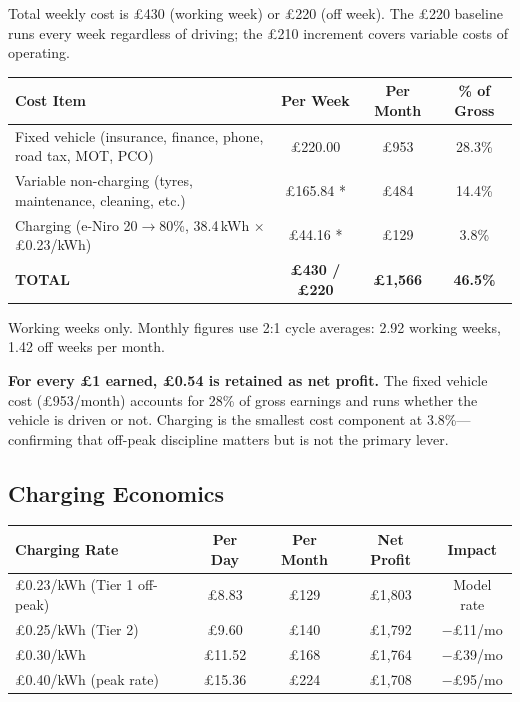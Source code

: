 \documentclass[a4paper,11pt]{article}
\begin{document}
Total weekly cost is \pounds430 (working week) or \pounds220 (off week). The \pounds220 baseline runs every week regardless of driving; the \pounds210 increment covers variable costs of operating.

\begin{tabularx}{\textwidth}{X C C C}
\toprule
\textbf{Cost Item} & \textbf{Per Week} & \textbf{Per Month} & \textbf{\% of Gross} \\
\midrule
Fixed vehicle (insurance, finance, phone, road tax, MOT, PCO) & \pounds220.00 & \pounds953 & 28.3\% \\
Variable non-charging (tyres, maintenance, cleaning, etc.) & \pounds165.84 * & \pounds484 & 14.4\% \\
Charging (e-Niro 20$\to$80\%, 38.4\,kWh $\times$ \pounds0.23/kWh) & \pounds44.16 * & \pounds129 & 3.8\% \\
\midrule
{} \textbf{TOTAL} & \textbf{\pounds430 / \pounds220} & \textbf{\pounds1,566} & \textbf{46.5\%} \\
\bottomrule
\end{tabularx}

\medskip
{\small * Working weeks only. Monthly figures use 2:1 cycle averages: 2.92 working weeks, 1.42 off weeks per month.}

\textbf{For every \pounds1 earned, \pounds0.54 is retained as net profit.} The fixed vehicle cost (\pounds953/month) accounts for 28\% of gross earnings and runs whether the vehicle is driven or not. Charging is the smallest cost component at 3.8\%---confirming that off-peak discipline matters but is not the primary lever.

\subsection{Charging Economics}

\begin{tabularx}{\textwidth}{X C C C C}
\toprule
\textbf{Charging Rate} & \textbf{Per Day} & \textbf{Per Month} & \textbf{Net Profit} & \textbf{Impact} \\
\midrule
\pounds0.23/kWh (Tier 1 off-peak) & \pounds8.83 & \pounds129 & \pounds1,803 & Model rate \\
\pounds0.25/kWh (Tier 2) & \pounds9.60 & \pounds140 & \pounds1,792 & $-$\pounds11/mo \\
\pounds0.30/kWh & \pounds11.52 & \pounds168 & \pounds1,764 & $-$\pounds39/mo \\
\pounds0.40/kWh (peak rate) & \pounds15.36 & \pounds224 & \pounds1,708 & $-$\pounds95/mo \\
\bottomrule
\end{tabularx}
\end{document}
